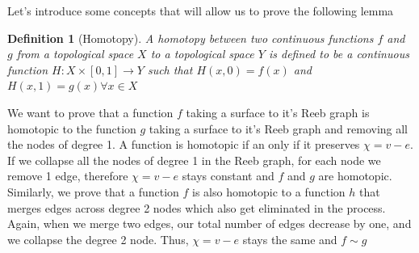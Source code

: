 \documentclass[]{article}
\newtheorem{definition}{Definition}
\begin{document}
Let's introduce some concepts that will allow us to prove the following lemma
\begin{definition}[Homotopy]
    A homotopy between two continuous functions $f$ and $g$ from a topological space $X$ to a topological space $Y$ is defined to be a continuous function $H: X \times [0,1] \to Y$ such that $H(x,0) = f(x)$ and $H(x,1) = g(x) \forall x \in X$
\end{definition}
We want to prove that a function $f$ taking a surface to it's Reeb graph is homotopic to the function $g$ taking a surface to it's Reeb graph and removing all the nodes of degree 1. A function is homotopic if an only if it preserves $\chi = v - e$. If we collapse all the nodes of degree 1 in the Reeb graph, for each node we remove 1 edge, therefore $\chi = v - e$ stays constant and $f$ and $g$ are homotopic. \\
Similarly, we prove that a function $f$ is also homotopic to a function $h$ that merges edges across degree 2 nodes which also get eliminated in the process. Again, when we merge two edges, our total number of edges decrease by one, and we collapse the degree 2 node. Thus, $\chi = v-e$ stays the same and $f \sim g$
\end{document}
